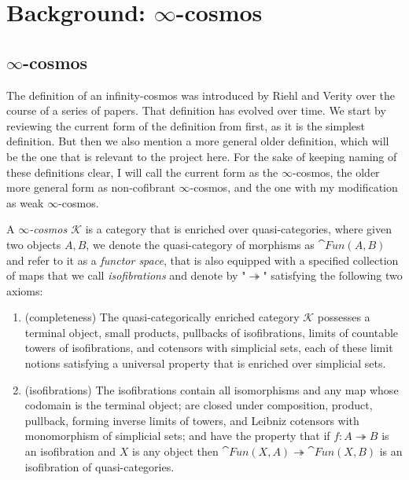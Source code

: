 \chapter{Background: $\infty$-cosmos}
\label{chap:infc}
\section{$\infty$-cosmos}
\label{sec:infct}
The definition of an infinity-cosmos was introduced by Riehl and Verity over the course of a series of papers. That definition has evolved over time. We start by reviewing the current form of the definition from \cite{RV-elements} first, as it is the simplest definition. But then we also mention a more general older definition, which will be the one that is relevant to the project here. For the sake of keeping naming of these definitions clear, I will call the current form as the $\infty$-cosmos, the older more general form as non-cofibrant $\infty$-cosmos, and the one with my modification as weak $\infty$-cosmos.

\begin{defn}
    A \emph{$\infty$-cosmos $\mathcal{K}$} is a category that is enriched over quasi-categories, where given two objects $A, B$, we denote the quasi-category of morphisms as $\cat{Fun(A,B)}$ and refer to it as a \emph{functor space}, that is also equipped with a specified collection of maps that we call \emph{isofibrations} and denote by "$\twoheadrightarrow$" satisfying the following two axioms:
    \begin{enumerate}
        \item (completeness) The quasi-categorically enriched category $\mathcal{K}$ possesses a terminal object, small products, pullbacks of isofibrations, limits of countable towers of isofibrations, and cotensors with simplicial sets, each of these limit notions satisfying a universal property that is enriched over simplicial sets.
        \item (isofibrations) The isofibrations contain all isomorphisms and any map whose codomain is the terminal object; are closed under composition, product, pullback, forming inverse limits of towers, and Leibniz cotensors with monomorphism of simplicial sets; and have the property that if $f:A\twoheadrightarrow B$ is an isofibration and $X$ is any object then $\cat{Fun(X,A)}\twoheadrightarrow \cat{Fun(X,B)}$ is an isofibration of quasi-categories.
    \end{enumerate}
\end{defn}

